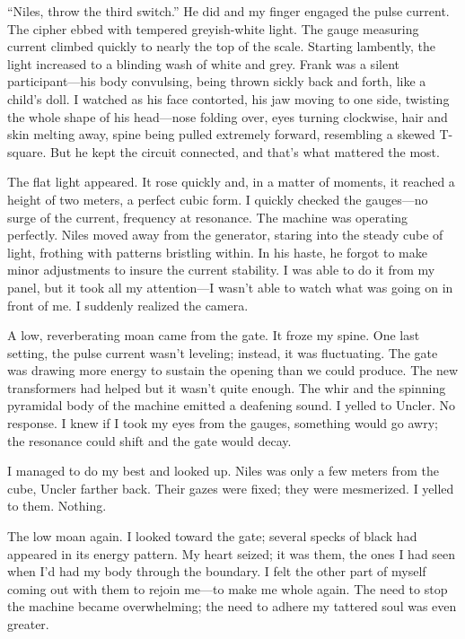 \documentclass[
]{article}
\begin{document}
``Niles, throw the third switch.'' He did and my finger engaged the
pulse current. The cipher ebbed with tempered greyish-white light. The
gauge measuring current climbed quickly to nearly the top of the scale.
Starting lambently, the light increased to a blinding wash of white and
grey. Frank was a silent participant---his body convulsing, being thrown
sickly back and forth, like a child's doll. I watched as his face
contorted, his jaw moving to one side, twisting the whole shape of his
head---nose folding over, eyes turning clockwise, hair and skin melting
away, spine being pulled extremely forward, resembling a skewed
T-square. But he kept the circuit connected, and that's what mattered
the most.

The flat light appeared. It rose quickly and, in a matter of moments, it
reached a height of two meters, a perfect cubic form. I quickly checked
the gauges---no surge of the current, frequency at resonance. The
machine was operating perfectly. Niles moved away from the generator,
staring into the steady cube of light, frothing with patterns bristling
within. In his haste, he forgot to make minor adjustments to insure the
current stability. I was able to do it from my panel, but it took all my
attention---I wasn't able to watch what was going on in front of me. I
suddenly realized the camera.

A low, reverberating moan came from the gate. It froze my spine. One
last setting, the pulse current wasn't leveling; instead, it was
fluctuating. The gate was drawing more energy to sustain the opening
than we could produce. The new transformers had helped but it wasn't
quite enough. The whir and the spinning pyramidal body of the machine
emitted a deafening sound. I yelled to Uncler. No response. I knew if I
took my eyes from the gauges, something would go awry; the resonance
could shift and the gate would decay.

I managed to do my best and looked up. Niles was only a few meters from
the cube, Uncler farther back. Their gazes were fixed; they were
mesmerized. I yelled to them. Nothing.

The low moan again. I looked toward the gate; several specks of black
had appeared in its energy pattern. My heart seized; it was them, the
ones I had seen when I'd had my body through the boundary. I felt the
other part of myself coming out with them to rejoin me---to make me
whole again. The need to stop the machine became overwhelming; the need
to adhere my tattered soul was even greater.
\end{document}
